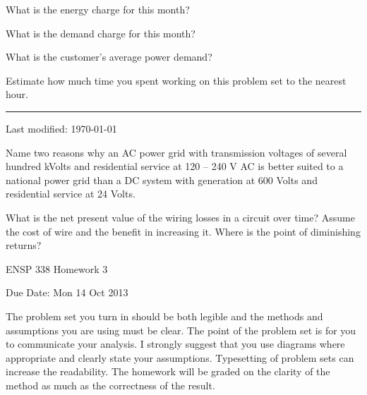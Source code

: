 \documentclass{article}
\begin{document}
\subproblem
What is the energy charge for this month?




\subproblem
What is the demand charge for this month?



\subproblem
What is the customer's average power demand?






\problem{}
Estimate how much time you spent working on this problem set to the
nearest hour.

\newpage
\setcounter{problem}{0}
\setcounter{page}{1}
\hrule
\vspace{10pt}

{\tiny Last modified: \today}

\problem{}
Name two reasons why an AC power grid with transmission voltages of several
hundred kVolts and residential service at 120 -- 240 V AC is better suited to a
national power grid than a DC system with generation at 600 Volts and
residential service at 24 Volts.

\problem{}
What is the net present value of the wiring losses in a circuit over
time?  Assume the cost of wire and the benefit in increasing it.  Where
is the point of diminishing returns?

 ENSP 338 Homework 3

Due Date:  Mon 14 Oct 2013

The problem set you turn in should be both legible and the methods and
assumptions you are using must be clear.  The point of the problem set
is for you to communicate your analysis.  I strongly suggest that you
use diagrams where appropriate and clearly state your assumptions.
Typesetting of problem sets can increase the readability.  The homework
will be graded on the clarity of the method as much as the correctness
of the result.
\end{document}
